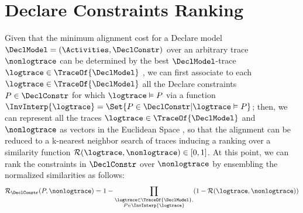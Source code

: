 \section{Declare Constraints Ranking}

Given that the minimum alignment cost for a Declare model $\DeclModel=(\Activities, \DeclConstr)$ over an arbitrary trace $\nonlogtrace$ can be determined by the best $\DeclModel$-trace $\logtrace\in\TraceOf{\DeclModel}$ \cite{LeoniMA12}, we can first associate to each $\logtrace\in\TraceOf{\DeclModel}$ all the Declare constraints $P\in\DeclConstr$ for which $\logtrace\vDash P$ via a function $\InvInterp{\logtrace}=\Set{P\in\DeclConstr | \logtrace\vDash P}$; then, 
we can represent all the traces $\logtrace\in\TraceOf{\DeclModel}$ and $\nonlogtrace$ as vectors  in the Euclidean Space \cite{CAiSE21}, so that the alignment can be reduced to a k-nearest neighbor search of traces inducing a ranking over a similarity function $\mathcal{R}(\logtrace,\nonlogtrace)\in[0,1]$. At this point, we can rank the constraints in $\DeclConstr$ over $\nonlogtrace$ by ensembling the normalized similarities as follows:
\[\mathcal{R}_\DeclConstr(P,\nonlogtrace)=1-\prod_{\substack{\logtrace\in\TraceOf{\DeclModel},\\ P\in\InvInterp{\logtrace}}}(1-\mathcal{R}(\logtrace,\nonlogtrace))\]
